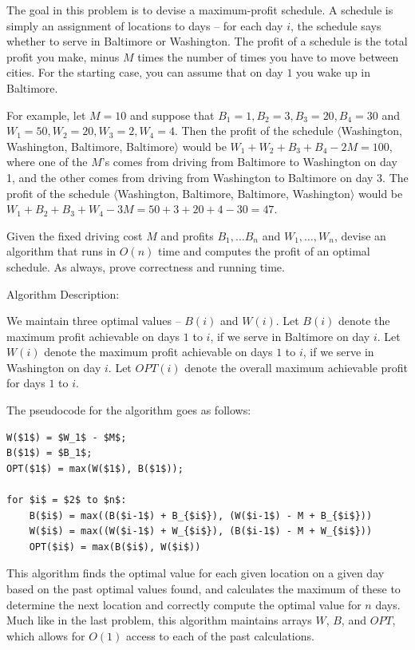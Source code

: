 \documentclass[11pt]{article}
\begin{document}
The goal in this problem is to devise a maximum-profit schedule. A schedule is simply an assignment of locations to days -- 
for each day $i$, the schedule says whether to serve in Baltimore or Washington. The profit of a schedule is the total profit you make, 
minus $M$ times the number of times you have to move between cities.  For the starting case, you can assume that on day $1$ you wake up in Baltimore.

For example, let $M = 10$ and suppose that $B_1 = 1, B_2 = 3, B_3 = 20, B_4 = 30$ and $W_1 = 50, W_2 = 20, W_3 = 2, W_4 = 4$. 
Then the profit of the schedule $\langle$Washington, Washington, Baltimore, Baltimore$\rangle$ would be $W_1 + W_2 + B_3 + B_4 - 2M = 100$, 
where one of the $M$'s comes from driving from Baltimore to Washington on day 1, and the other comes from driving from Washington to Baltimore on day 3. 
The profit of the schedule $\langle$Washington, Baltimore, Baltimore, Washington$\rangle$ would be $W_1 + B_2 + B_3 + W_4 - 3M = 50 +3 + 20 + 4 - 30 = 47$.

Given the fixed driving cost $M$ and profits $B_1, \dots B_n$ and $W_1, \dots, W_n$, 
devise an algorithm that runs in $O(n)$ time and computes the profit of an optimal schedule. 
As always, prove correctness and running time.  

\bigbreak

Algorithm Description:

We maintain three optimal values -- $B(i)$ and $W(i)$. Let $B(i)$ denote the maximum profit achievable on days $1$ to $i$, 
if we serve in Baltimore on day $i$. Let $W(i)$ denote the maximum profit achievable on days $1$ to $i$, if we serve in Washington on day $i$. 
Let $OPT(i)$ denote the overall maximum achievable profit for days $1$ to $i$.

The pseudocode for the algorithm goes as follows:

\begin{lstlisting}[mathescape]
W($1$) = $W_1$ - $M$;
B($1$) = $B_1$;
OPT($1$) = max(W($1$), B($1$));

for $i$ = $2$ to $n$:
    B($i$) = max((B($i-1$) + B_{$i$}), (W($i-1$) - M + B_{$i$}))
    W($i$) = max((W($i-1$) + W_{$i$}), (B($i-1$) - M + W_{$i$}))
    OPT($i$) = max(B($i$), W($i$))
\end{lstlisting}

This algorithm finds the optimal value for each given location on a given day based on the past optimal values found, 
and calculates the maximum of these to determine the next location and correctly compute the optimal value for $n$ days. 
Much like in the last problem, this algorithm maintains arrays $W$, $B$, and $OPT$, which allows for $O(1)$ access to each of the past calculations. 
\end{document}
